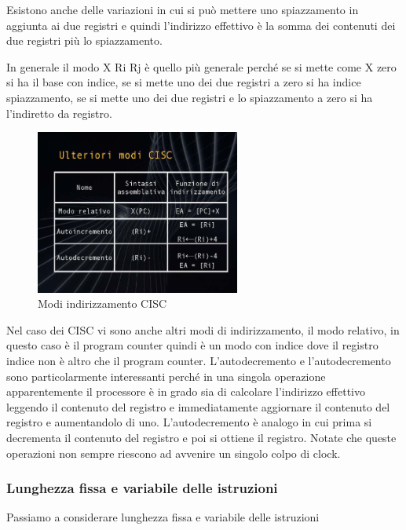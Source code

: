 Esistono anche delle variazioni in cui si può mettere uno spiazzamento in aggiunta ai due registri e quindi l'indirizzo  effettivo è la somma dei contenuti dei due registri più lo spiazzamento.

In generale il modo X Ri Rj è quello più generale perché se si mette come X zero si ha il base con indice, se si mette uno dei due registri a zero si ha indice spiazzamento, se si mette uno dei due registri e lo spiazzamento a zero si ha  l'indiretto da registro.
\FloatBarrier
\begin{figure}[H]
  \centering
  \includegraphics[width=0.6\textwidth,
                    trim=40 40 15 40, %
                    clip]{images/Lez02_p04_fig_01.png}
  \caption{Modi indirizzamento CISC}
  \label{fig:Lez02_p04_fig_01}
\end{figure}
\FloatBarrier
\noindent

Nel caso dei CISC vi sono anche altri modi di indirizzamento, il modo relativo, in questo caso è il program counter quindi è un modo con indice dove il registro indice non è altro che il program counter.
L'autodecremento e l'autodecremento sono particolarmente interessanti perché in una singola operazione apparentemente il processore è in grado sia di calcolare l'indirizzo effettivo leggendo il contenuto del registro e immediatamente aggiornare il contenuto del registro e aumentandolo di uno.
L'autodecremento è analogo in cui prima si decrementa il contenuto del registro e poi si ottiene il registro.
Notate che queste operazioni non sempre riescono ad avvenire un singolo colpo di clock. 

\subsubsection{Lunghezza fissa e variabile delle istruzioni}

Passiamo a considerare lunghezza fissa e variabile delle istruzioni 

